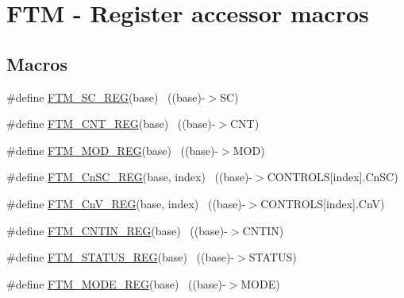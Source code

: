 \hypertarget{group___f_t_m___register___accessor___macros}{}\section{F\+TM -\/ Register accessor macros}
\label{group___f_t_m___register___accessor___macros}
\subsection*{Macros}
\begin{DoxyCompactItemize}
\item 
\#define \hyperlink{group___f_t_m___register___accessor___macros_ga0b48df6cbccecf754cc49bb7ea1e3aad}{F\+T\+M\+\_\+\+S\+C\+\_\+\+R\+EG}(base)                                              ~((base)-\/$>$SC)
\item 
\#define \hyperlink{group___f_t_m___register___accessor___macros_ga1ba1654f76ecc24de48047117cb5b45e}{F\+T\+M\+\_\+\+C\+N\+T\+\_\+\+R\+EG}(base)                                            ~((base)-\/$>$C\+NT)
\item 
\#define \hyperlink{group___f_t_m___register___accessor___macros_gabbea5752afc54317fcb50890f8593a49}{F\+T\+M\+\_\+\+M\+O\+D\+\_\+\+R\+EG}(base)                                            ~((base)-\/$>$M\+OD)
\item 
\#define \hyperlink{group___f_t_m___register___accessor___macros_ga49332bccc11dd36d399f3fff66f313b5}{F\+T\+M\+\_\+\+Cn\+S\+C\+\_\+\+R\+EG}(base,  index)                              ~((base)-\/$>$C\+O\+N\+T\+R\+O\+LS\mbox{[}index\mbox{]}.Cn\+SC)
\item 
\#define \hyperlink{group___f_t_m___register___accessor___macros_gaacf8fed24da463653900319184874197}{F\+T\+M\+\_\+\+Cn\+V\+\_\+\+R\+EG}(base,  index)                                ~((base)-\/$>$C\+O\+N\+T\+R\+O\+LS\mbox{[}index\mbox{]}.CnV)
\item 
\#define \hyperlink{group___f_t_m___register___accessor___macros_ga2bac47a7c51c2e7f81edba5a00f949f2}{F\+T\+M\+\_\+\+C\+N\+T\+I\+N\+\_\+\+R\+EG}(base)                                        ~((base)-\/$>$C\+N\+T\+IN)
\item 
\#define \hyperlink{group___f_t_m___register___accessor___macros_gae9cc2c8dd99da090bcbe0039637f4b0d}{F\+T\+M\+\_\+\+S\+T\+A\+T\+U\+S\+\_\+\+R\+EG}(base)                                      ~((base)-\/$>$S\+T\+A\+T\+US)
\item 
\#define \hyperlink{group___f_t_m___register___accessor___macros_ga2b015e87a081f48499ab1becb9c003c9}{F\+T\+M\+\_\+\+M\+O\+D\+E\+\_\+\+R\+EG}(base)                                          ~((base)-\/$>$M\+O\+DE)

\end{DoxyCompactItemize}
